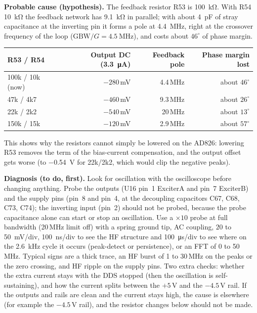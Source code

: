 \documentclass[11pt,a4paper]{article}
\begin{document}
\textbf{Probable cause (hypothesis).}  The feedback resistor R53 is \SI{100}{\kilo\ohm}.  With
R54 \SI{10}{\kilo\ohm} the feedback network has \SI{9.1}{\kilo\ohm} in parallel; with about
\SI{4}{\pico\farad} of stray capacitance at the inverting pin it forms a pole at
\SI{4.4}{\mega\hertz}, right at the crossover frequency of the loop ($\mathrm{GBW}/G=\SI{4.5}{\mega\hertz}$),
and costs about $46^{\circ}$ of phase margin.
\begin{center}
\small
\begin{tabular}{@{}lrrr@{}}
\toprule
R53 / R54 & Output DC (\SI{3.3}{\micro\ampere}) & Feedback pole & Phase margin lost \\
\midrule
100k / 10k (now) & $-280$\,mV & 4.4\,MHz & about $46^{\circ}$ \\
47k / 4k7        & $-460$\,mV & 9.3\,MHz & about $26^{\circ}$ \\
22k / 2k2        & $-540$\,mV & 20\,MHz  & about $13^{\circ}$ \\
150k / 15k       & $-120$\,mV & 2.9\,MHz & about $57^{\circ}$ \\
\bottomrule
\end{tabular}
\end{center}
This shows why the resistors cannot simply be lowered on the AD826: lowering R53 removes the
term of the bias-current compensation, and the output offset gets worse (to \SI{-0.54}{\volt}
for 22k/2k2, which would clip the negative peaks).

\textbf{Diagnosis (to do, first).}  Look for oscillation with the oscilloscope before changing
anything.  Probe the outputs (U16 pin~1 ExciterA and pin~7 ExciterB) and the supply pins
(pin~8 and pin~4, at the decoupling capacitors C67, C68, C73, C74); the inverting input (pin~2)
should not be probed, because the probe capacitance alone can start or stop an oscillation.  Use a
$\times10$ probe at full bandwidth (20\,MHz limit off) with a spring ground tip, AC coupling,
$20$ to \SI{50}{\milli\volt}/div, \SI{100}{\nano\second}/div to see the HF structure and
\SI{100}{\micro\second}/div to see where on the \SI{2.6}{\kilo\hertz} cycle it occurs
(peak-detect or persistence), or an FFT of 0 to 50\,MHz.  Typical signs are a thick trace, an HF
burst of 1 to 30\,MHz on the peaks or the zero crossing, and HF ripple on the supply pins.  Two
extra checks: whether the extra current stays with the DDS stopped (then the oscillation is
self-sustaining), and how the current splits between the $+5$\,V and the $-4.5$\,V rail.  If
the outputs and rails are clean and the current stays high, the cause is elsewhere (for example
the $-4.5$\,V rail), and the resistor changes below should not be made.
\end{document}
